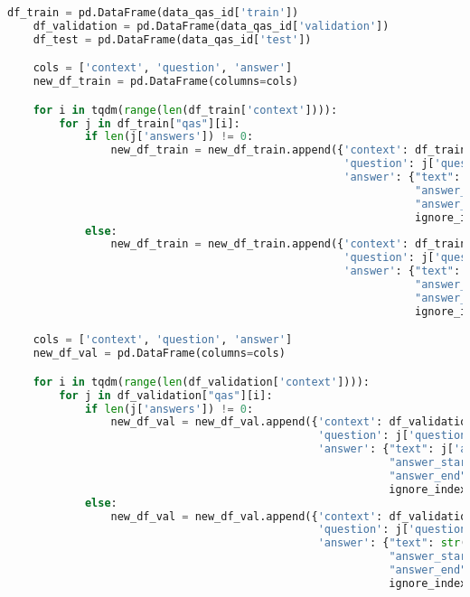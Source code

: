 \begin{lstlisting}[language=Python, caption=Mengimpor \emph{dataset} sistem tanya jawab]
    df_train = pd.DataFrame(data_qas_id['train'])
    df_validation = pd.DataFrame(data_qas_id['validation'])
    df_test = pd.DataFrame(data_qas_id['test'])

    cols = ['context', 'question', 'answer']
    new_df_train = pd.DataFrame(columns=cols)

    for i in tqdm(range(len(df_train['context']))):
        for j in df_train["qas"][i]:
            if len(j['answers']) != 0:
                new_df_train = new_df_train.append({'context': df_train["context"][i], 
                                                    'question': j['question'], 
                                                    'answer': {"text": j['answers'][0]['text'], 
                                                               "answer_start": j['answers'][0]['answer_start'], 
                                                               "answer_end": j['answers'][0]['answer_start'] + len(j['answers'][0]['text'])}}, 
                                                               ignore_index=True)
            else:
                new_df_train = new_df_train.append({'context': df_train["context"][i], 
                                                    'question': j['question'], 
                                                    'answer': {"text": str(), 
                                                               "answer_start": 0, 
                                                               "answer_end": 0}}, 
                                                               ignore_index=True)

    cols = ['context', 'question', 'answer']
    new_df_val = pd.DataFrame(columns=cols)

    for i in tqdm(range(len(df_validation['context']))):
        for j in df_validation["qas"][i]:
            if len(j['answers']) != 0:
                new_df_val = new_df_val.append({'context': df_validation["context"][i], 
                                                'question': j['question'], 
                                                'answer': {"text": j['answers'][0]['text'], 
                                                           "answer_start": j['answers'][0]['answer_start'], 
                                                           "answer_end": j['answers'][0]['answer_start'] + len(j['answers'][0]['text'])}}, 
                                                           ignore_index=True)
            else:
                new_df_val = new_df_val.append({'context': df_validation["context"][i], 
                                                'question': j['question'], 
                                                'answer': {"text": str(), 
                                                           "answer_start": 0, 
                                                           "answer_end": 0}}, 
                                                           ignore_index=True)        


\end{lstlisting}
